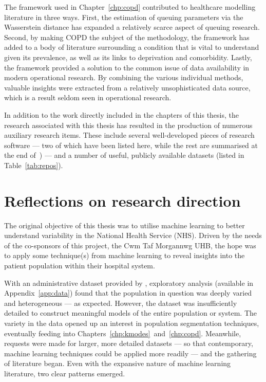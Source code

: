 The framework used in Chapter~\ref{chp:copd} contributed to healthcare modelling
literature in three ways. First, the estimation of queuing parameters via the
Wasserstein distance has expanded a relatively scarce aspect of queuing
research. Second, by making COPD the subject of the methodology, the framework
has added to a body of literature surrounding a condition that is vital to
understand given its prevalence, as well as its links to deprivation and
comorbidity. Lastly, the framework provided a solution to the common issue of
data availability in modern operational research. By combining the various
individual methods, valuable insights were extracted from a relatively
unsophisticated data source, which is a result seldom seen in operational
research.

In addition to the work directly included in the chapters of this thesis, the
research associated with this thesis has resulted in the production of numerous
auxiliary research items. These include several well-developed pieces of
research software --- two of which have been listed here, while the rest are
summarised at the end of~) --- and a number of useful,
publicly available datasets (listed in Table~\ref{tab:repos}).


\section{Reflections on research direction}\label{sec:reflections}

The original objective of this thesis was to utilise machine learning to
better understand variability in the National Health Service (NHS). Driven by
the needs of the co-sponsors of this project, the Cwm Taf Morgannwg UHB, the
hope was to apply some technique(s) from machine learning to reveal insights
into the patient population within their hospital system.

With an administrative dataset provided by \ctmuhb, exploratory analysis
(available in Appendix~\ref{app:data}) found that the population in question was
deeply varied and heterogeneous --- as expected. However, the dataset was
insufficiently detailed to construct meaningful models of the entire population
or system. The variety in the data opened up an interest in population
segmentation techniques, eventually feeding into
Chapters~\ref{chp:kmodes}~and~\ref{chp:copd}. Meanwhile, requests were made for
larger, more detailed datasets --- so that contemporary, machine learning
techniques could be applied more readily --- and the gathering of literature
began. Even with the expansive nature of machine learning literature, two clear
patterns emerged.

